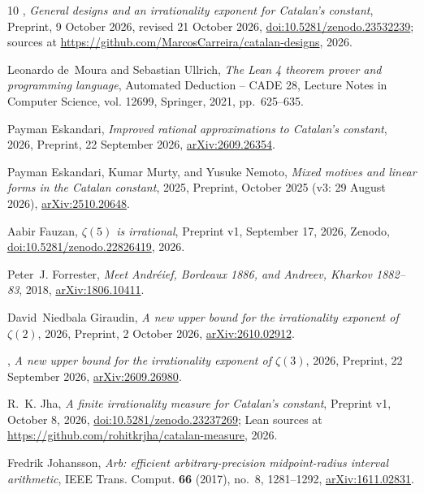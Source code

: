 \documentclass[11pt]{amsart}
\theoremstyle{definition}
\theoremstyle{remark}
\numberwithin{equation}{section}
\begin{document}
\begin{thebibliography}{10}
\bysame, \emph{General designs and an irrationality exponent for {C}atalan's
  constant}, Preprint, 9 October 2026, revised 21 October 2026,
  \href{https://doi.org/10.5281/zenodo.23532239}{doi:10.5281/zenodo.23532239};
  sources at \url{https://github.com/MarcosCarreira/catalan-designs}, 2026.

Leonardo de~Moura and Sebastian Ullrich, \emph{The {L}ean 4 theorem prover and
  programming language}, Automated Deduction -- CADE 28, Lecture Notes in
  Computer Science, vol. 12699, Springer, 2021, pp.~625--635.

Payman Eskandari, \emph{Improved rational approximations to {C}atalan's
  constant}, 2026, Preprint, 22 September 2026,
  \href{https://arxiv.org/abs/2609.26354}{arXiv:2609.26354}.

Payman Eskandari, Kumar Murty, and Yusuke Nemoto, \emph{Mixed motives and
  linear forms in the {C}atalan constant}, 2025, Preprint, October 2025 (v3: 29
  August 2026), \href{https://arxiv.org/abs/2510.20648}{arXiv:2510.20648}.

Aabir Fauzan, \emph{{$\zeta(5)$} is irrational}, Preprint v1, September 17,
  2026, Zenodo,
  \href{https://doi.org/10.5281/zenodo.22826419}{doi:10.5281/zenodo.22826419},
  2026.

Peter~J. Forrester, \emph{Meet {A}ndr\'eief, {B}ordeaux 1886, and {A}ndreev,
  {K}harkov 1882--83}, 2018,
  \href{https://arxiv.org/abs/1806.10411}{arXiv:1806.10411}.

David~Niedbala Giraudin, \emph{A new upper bound for the irrationality exponent
  of {$\zeta(2)$}}, 2026, Preprint, 2 October 2026,
  \href{https://arxiv.org/abs/2610.02912}{arXiv:2610.02912}.

\bysame, \emph{A new upper bound for the irrationality exponent of
  {$\zeta(3)$}}, 2026, Preprint, 22 September 2026,
  \href{https://arxiv.org/abs/2609.26980}{arXiv:2609.26980}.

R.~K. Jha, \emph{A finite irrationality measure for {C}atalan's constant},
  Preprint v1, October 8, 2026,
  \href{https://doi.org/10.5281/zenodo.23237269}{doi:10.5281/zenodo.23237269};
  Lean sources at \url{https://github.com/rohitkrjha/catalan-measure}, 2026.

Fredrik Johansson, \emph{Arb: efficient arbitrary-precision midpoint-radius
  interval arithmetic}, IEEE Trans. Comput. \textbf{66} (2017), no.~8,
  1281--1292, \href{https://arxiv.org/abs/1611.02831}{arXiv:1611.02831}.


\end{thebibliography}
\end{document}
